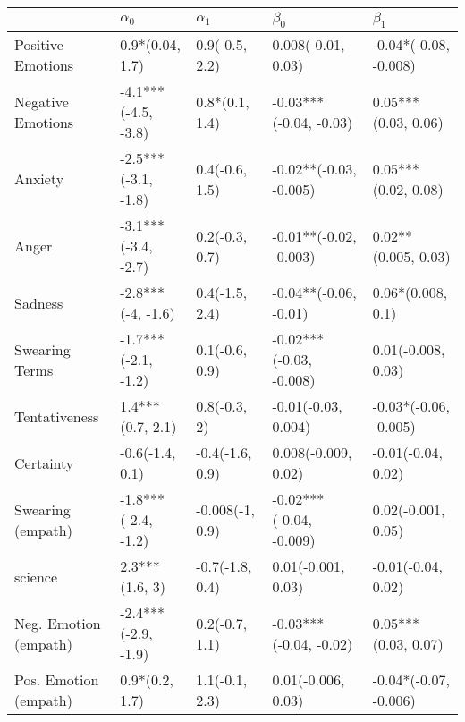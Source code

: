 \begin{tabular}{lllll}
\toprule
{} &           $\alpha_0$ &       $\alpha_1$ &                $\beta_0$ &              $\beta_1$ \\
\midrule
Positive Emotions     &      0.9*(0.04, 1.7) &   0.9(-0.5, 2.2) &       0.008(-0.01, 0.03) &  -0.04*(-0.08, -0.008) \\
Negative Emotions     &  -4.1***(-4.5, -3.8) &   0.8*(0.1, 1.4) &   -0.03***(-0.04, -0.03) &    0.05***(0.03, 0.06) \\
Anxiety               &  -2.5***(-3.1, -1.8) &   0.4(-0.6, 1.5) &   -0.02**(-0.03, -0.005) &    0.05***(0.02, 0.08) \\
Anger                 &  -3.1***(-3.4, -2.7) &   0.2(-0.3, 0.7) &   -0.01**(-0.02, -0.003) &    0.02**(0.005, 0.03) \\
Sadness               &    -2.8***(-4, -1.6) &   0.4(-1.5, 2.4) &    -0.04**(-0.06, -0.01) &      0.06*(0.008, 0.1) \\
Swearing Terms        &  -1.7***(-2.1, -1.2) &   0.1(-0.6, 0.9) &  -0.02***(-0.03, -0.008) &     0.01(-0.008, 0.03) \\
Tentativeness         &     1.4***(0.7, 2.1) &     0.8(-0.3, 2) &      -0.01(-0.03, 0.004) &  -0.03*(-0.06, -0.005) \\
Certainty             &      -0.6(-1.4, 0.1) &  -0.4(-1.6, 0.9) &      0.008(-0.009, 0.02) &     -0.01(-0.04, 0.02) \\
Swearing (empath)     &  -1.8***(-2.4, -1.2) &  -0.008(-1, 0.9) &  -0.02***(-0.04, -0.009) &     0.02(-0.001, 0.05) \\
science               &       2.3***(1.6, 3) &  -0.7(-1.8, 0.4) &       0.01(-0.001, 0.03) &     -0.01(-0.04, 0.02) \\
Neg. Emotion (empath) &  -2.4***(-2.9, -1.9) &   0.2(-0.7, 1.1) &   -0.03***(-0.04, -0.02) &    0.05***(0.03, 0.07) \\
Pos. Emotion (empath) &       0.9*(0.2, 1.7) &   1.1(-0.1, 2.3) &       0.01(-0.006, 0.03) &  -0.04*(-0.07, -0.006) \\
\bottomrule
\end{tabular}
